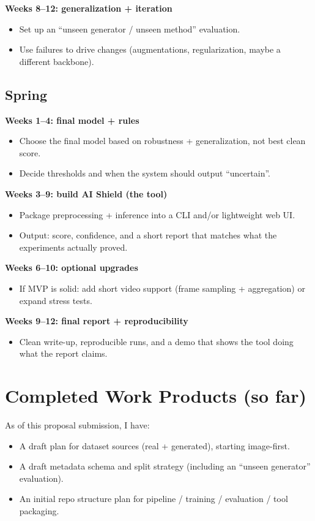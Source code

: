 \documentclass[11pt]{article}
\begin{document}
\textbf{Weeks 8--12: generalization + iteration}
\begin{itemize}[leftmargin=1.4em, itemsep=0pt]
  \item Set up an ``unseen generator / unseen method'' evaluation.
  \item Use failures to drive changes (augmentations, regularization, maybe a different backbone).
\end{itemize}

\subsection{Spring}

\textbf{Weeks 1--4: final model + rules}
\begin{itemize}[leftmargin=1.4em, itemsep=0pt]
  \item Choose the final model based on robustness + generalization, not best clean score.
  \item Decide thresholds and when the system should output ``uncertain''.
\end{itemize}

\textbf{Weeks 3--9: build AI Shield (the tool)}
\begin{itemize}[leftmargin=1.4em, itemsep=0pt]
  \item Package preprocessing + inference into a CLI and/or lightweight web UI.
  \item Output: score, confidence, and a short report that matches what the experiments actually proved.
\end{itemize}

\textbf{Weeks 6--10: optional upgrades}
\begin{itemize}[leftmargin=1.4em, itemsep=0pt]
  \item If MVP is solid: add short video support (frame sampling + aggregation) or expand stress tests.
\end{itemize}

\textbf{Weeks 9--12: final report + reproducibility}
\begin{itemize}[leftmargin=1.4em, itemsep=0pt]
  \item Clean write-up, reproducible runs, and a demo that shows the tool doing what the report claims.
\end{itemize}

\section{Completed Work Products (so far)}
As of this proposal submission, I have:
\begin{itemize}[leftmargin=1.4em, itemsep=0pt]
  \item A draft plan for dataset sources (real + generated), starting image-first.
  \item A draft metadata schema and split strategy (including an ``unseen generator'' evaluation).
  \item An initial repo structure plan for pipeline / training / evaluation / tool packaging.
\end{itemize}
\end{document}
